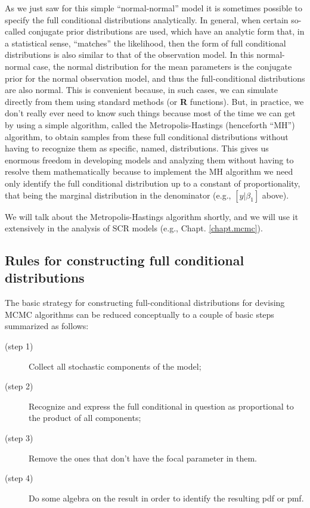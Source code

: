 As we just saw for this simple ``normal-normal'' model it is sometimes
possible to specify the full conditional distributions
analytically. In general, when certain so-called conjugate prior
distributions are used, which have an analytic form that, in a
statistical
sense, ``matches'' the likelihood, then the form of full conditional distributions
is also similar to that of the observation model. In this normal-normal
case, the normal distribution for the mean parameters is the conjugate
prior for the normal observation model, and thus the full-conditional
distributions are also normal. This is convenient because, in such
cases, we can simulate directly from them using standard methods (or
{\bf R}
functions).  But, in practice, we don't really ever need to know such
things because most of the time we can get by using a simple
algorithm, called the Metropolis-Hastings (henceforth ``MH'')
algorithm, to obtain samples from these full conditional distributions
without having to recognize them as specific, named, distributions.
This gives us enormous freedom in developing models
and analyzing them without having to resolve them mathematically
because to implement the MH algorithm we need only identify the full
conditional distribution up to a constant of proportionality, that
being the marginal distribution in the denominator (e.g., $[y|\beta_1]$
above).

We will talk about the Metropolis-Hastings algorithm shortly, and we
will use it extensively in the analysis of SCR models (e.g., Chapt.
\ref{chapt.mcmc}).

\subsection{Rules for constructing full conditional distributions}
\label{glms.sec.rules}

The basic strategy for constructing full-conditional distributions for
devising MCMC algorithms can be reduced conceptually to a couple of
basic steps summarized as follows:

\begin{description}
\item[   (step 1)] Collect all stochastic components of the model;
\item[   (step 2)] Recognize and express the full conditional in question
  as proportional to the product of all components;
\item[   (step 3)] Remove the ones that don't have the focal parameter in them.
\item[   (step 4)] Do some algebra on the result in order to identify the resulting pdf or pmf.
\end{description}

